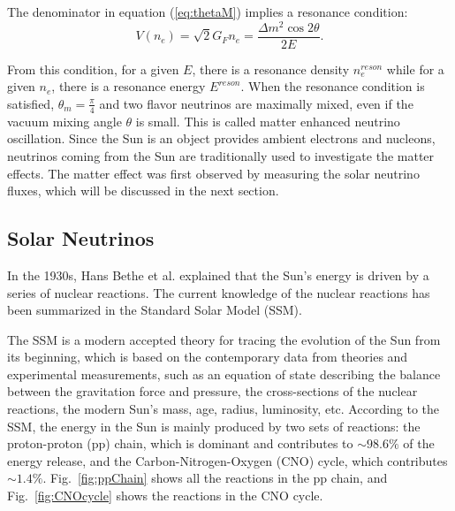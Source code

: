 The denominator in equation (\ref{eq:thetaM}) implies a resonance condition:
\begin{equation}\label{eq:reson_condition}
	V(n_e)=\sqrt 2G_Fn_e=\frac{\Delta m^2\cos2\theta}{2E}.
\end{equation}

From this condition, for a given $E$, there is a resonance density $n^{reson}_e$ while for a given $n_e$, there is a resonance energy $E^{reson}$. When the resonance condition is satisfied, $\theta_m = \frac{\pi}{4}$ and two flavor neutrinos are maximally mixed, even if the vacuum mixing angle $\theta$ is small. This is called matter enhanced neutrino oscillation\cite{smirnov2016solar,fukugita2013physics}. Since the Sun is an object provides ambient electrons and nucleons, neutrinos coming from the Sun are traditionally used to investigate the matter effects. The matter effect was first observed by measuring the solar neutrino fluxes, which will be discussed in the next section.

\subsection{Solar Neutrinos}\label{sect:solarNu}
In the 1930s, Hans Bethe et al. explained that the Sun's energy is driven by a series of nuclear reactions\cite{bethe1939energy}. The current knowledge of the nuclear reactions has been summarized in the Standard Solar Model (SSM). 

The SSM is a modern accepted theory for tracing the evolution of the Sun from its beginning, which is based on the contemporary data from theories and experimental measurements, such as an equation of state describing the balance between the gravitation force and pressure, the cross-sections of the nuclear reactions, the modern Sun's mass, age, radius, luminosity, etc\cite{haxton2013solar}. According to the SSM, the energy in the Sun is mainly produced by two sets of reactions: the proton-proton (pp) chain, which is dominant and contributes to $\sim 98.6\%$ of the energy release, and the Carbon-Nitrogen-Oxygen (CNO) cycle, which contributes $\sim 1.4\%$\cite{antonio2018state}. Fig.~\ref{fig:ppChain} shows all the reactions in the pp chain, and Fig.~\ref{fig:CNOcycle} shows the reactions in the CNO cycle. 

